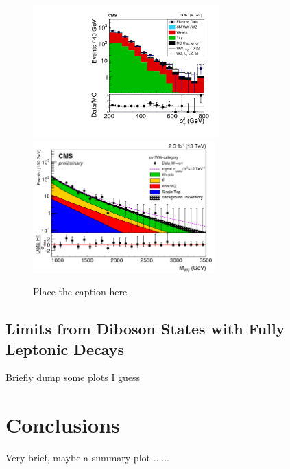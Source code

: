 \documentclass[10pt]{article}
\begin{document}
\begin{figure}[htb]
  \centering
    \includegraphics[height=2in]{figures/WV8TeV_ptJ_aC.png}
    \includegraphics[height=2in]{figures/WV13TeV_mWW_aC.png}
  \caption{ Place the caption here}
  \label{fig:zgamma_etmiss}
\end{figure}

\subsection{Limits from Diboson States with Fully Leptonic Decays}

Briefly dump some plots I guess

\section{Conclusions}

Very brief, maybe a summary plot
...... \cite{CMS:2016djf} \cite{Cascioli:2014yka} 



\end{document}
